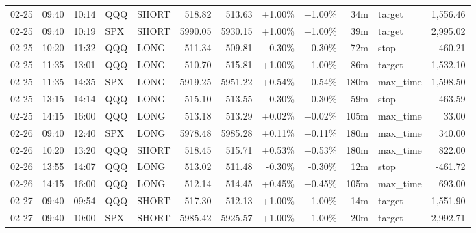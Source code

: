\documentclass[11pt,a4paper,twoside]{article}
\begin{document}
\begin{center}
\begin{longtable}{>{\color{txtmain}}l l l l l r r r r r >{\color{txtmain}}l r}
02-25 & 09:40 & 10:14 & QQQ & SHORT & 518.82 & 513.63 & \textcolor{wingreen}{+1.00\%} & \textcolor{wingreen}{+1.00\%} & 34m & target & \textcolor{wingreen}{1,556.46} \\
02-25 & 09:40 & 10:19 & SPX & SHORT & 5990.05 & 5930.15 & \textcolor{wingreen}{+1.00\%} & \textcolor{wingreen}{+1.00\%} & 39m & target & \textcolor{wingreen}{2,995.02} \\
02-25 & 10:20 & 11:32 & QQQ & LONG & 511.34 & 509.81 & \textcolor{lossred}{-0.30\%} & \textcolor{lossred}{-0.30\%} & 72m & stop & \textcolor{lossred}{-460.21} \\
02-25 & 11:35 & 13:01 & QQQ & LONG & 510.70 & 515.81 & \textcolor{wingreen}{+1.00\%} & \textcolor{wingreen}{+1.00\%} & 86m & target & \textcolor{wingreen}{1,532.10} \\
02-25 & 11:35 & 14:35 & SPX & LONG & 5919.25 & 5951.22 & \textcolor{wingreen}{+0.54\%} & \textcolor{wingreen}{+0.54\%} & 180m & max\_time & \textcolor{wingreen}{1,598.50} \\
02-25 & 13:15 & 14:14 & QQQ & LONG & 515.10 & 513.55 & \textcolor{lossred}{-0.30\%} & \textcolor{lossred}{-0.30\%} & 59m & stop & \textcolor{lossred}{-463.59} \\
02-25 & 14:15 & 16:00 & QQQ & LONG & 513.18 & 513.29 & \textcolor{wingreen}{+0.02\%} & \textcolor{wingreen}{+0.02\%} & 105m & max\_time & \textcolor{wingreen}{33.00} \\
02-26 & 09:40 & 12:40 & SPX & LONG & 5978.48 & 5985.28 & \textcolor{wingreen}{+0.11\%} & \textcolor{wingreen}{+0.11\%} & 180m & max\_time & \textcolor{wingreen}{340.00} \\
02-26 & 10:20 & 13:20 & QQQ & SHORT & 518.45 & 515.71 & \textcolor{wingreen}{+0.53\%} & \textcolor{wingreen}{+0.53\%} & 180m & max\_time & \textcolor{wingreen}{822.00} \\
02-26 & 13:55 & 14:07 & QQQ & LONG & 513.02 & 511.48 & \textcolor{lossred}{-0.30\%} & \textcolor{lossred}{-0.30\%} & 12m & stop & \textcolor{lossred}{-461.72} \\
02-26 & 14:15 & 16:00 & QQQ & LONG & 512.14 & 514.45 & \textcolor{wingreen}{+0.45\%} & \textcolor{wingreen}{+0.45\%} & 105m & max\_time & \textcolor{wingreen}{693.00} \\
02-27 & 09:40 & 09:54 & QQQ & SHORT & 517.30 & 512.13 & \textcolor{wingreen}{+1.00\%} & \textcolor{wingreen}{+1.00\%} & 14m & target & \textcolor{wingreen}{1,551.90} \\
02-27 & 09:40 & 10:00 & SPX & SHORT & 5985.42 & 5925.57 & \textcolor{wingreen}{+1.00\%} & \textcolor{wingreen}{+1.00\%} & 20m & target & \textcolor{wingreen}{2,992.71} \\

\end{longtable}
\end{center}
\end{document}
